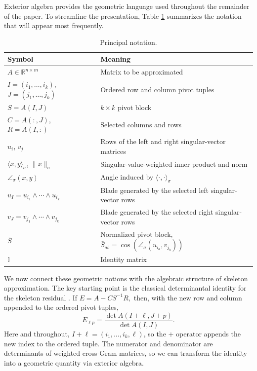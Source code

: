 \documentclass[11pt, preprint]{article}
\newcommand{\R}{\mathbb{R}}
\newcommand{\inner}[1]{\langle #1\rangle}
\begin{document}
Exterior algebra provides the geometric language used throughout the remainder of the paper. To streamline the presentation, Table \ref{tab:notation} summarizes the notation that will appear most frequently.  

\begin{table}[t]
\caption{Principal notation.}
\label{tab:notation}
\centering
\small
\renewcommand{\arraystretch}{1.15}
\begin{tabular}{@{}ll@{}}
\toprule
Symbol & Meaning \\
\midrule
$A\in\R^{n\times m}$ & Matrix to be approximated \\
$I=(i_1,\ldots,i_k)$, $J=(j_1,\ldots,j_k)$ & Ordered row and column pivot tuples \\
$S=A(I,J)$ & $k\times k$ pivot block \\
$C=A(:,J)$, $R=A(I,:)$ & Selected columns and rows \\
$u_i$, $v_j$ & Rows of the left and right singular-vector matrices \\
$\inner{x,y}_\sigma$, $\|x\|_\sigma$ & Singular-value-weighted inner product and norm \\
$\angle_\sigma(x,y)$ & Angle induced by $\inner{\cdot,\cdot}_\sigma$ \\
$u_I=u_{i_1}\wedge\cdots\wedge u_{i_k}$ & Blade generated by the selected left singular-vector rows \\
$v_J=v_{j_1}\wedge\cdots\wedge v_{j_k}$ & Blade generated by the selected right singular-vector rows \\
$\bar S$ & Normalized pivot block, $\bar S_{ab}=\cos(\angle_\sigma(u_{i_a},v_{j_b}))$ \\
$\mathbb{I}$ & Identity matrix \\
\bottomrule
\end{tabular}
\end{table}

We now connect these geometric notions with the algebraic structure of skeleton approximation. The key starting point is the classical determinantal identity for the skeleton residual \cite{Cortinovis_MaximumVolumeSubmatrices2019}.  If
\(
E=A-CS^{-1}R,
\)
then, with the new row and column appended to the ordered pivot tuples,
\[
E_{\ell p}
=
\frac{\det A(I+\ell,J+p)}{\det A(I,J)}.
\]
Here and throughout, $I+\ell=(i_1,...,i_k, \ell)$, so the $+$ operator appends the new index to the ordered tuple. 
The numerator and denominator are determinants of weighted cross-Gram matrices, so we can transform the identity into a geometric quantity via exterior algebra. 
\end{document}
